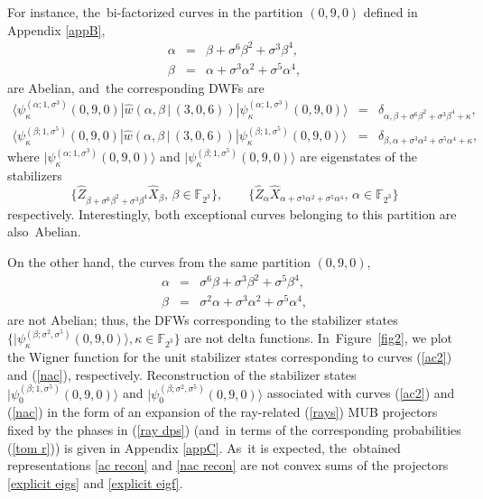 \documentclass[quantumrep,article,accept,pdftex,moreauthors]{Definitions/mdpi}
\begin{document}
For instance, the~bi-factorized curves in the partition $(0,9,0)$ defined in
Appendix \ref{appB},
\begin{eqnarray}
  \alpha
  &=& \beta + \sigma^{6} \beta^{2} + \sigma^{3}\beta^{4},
  \label{ac1} \\
  \beta
  &=& \alpha + \sigma^{3} \alpha^{2} + \sigma^{5}\alpha^{4},
  \label{ac2}
\end{eqnarray}
are Abelian, and~the corresponding DWFs are
\begin{eqnarray}
  \langle \psi_{\kappa}^{(\alpha ; 1,\sigma^{3})}(0,9,0)
  |\hat{w}\left(\alpha,\beta \, | \, (3,0,6)\right)
  |\psi_{\kappa}^{(\alpha ; 1,\sigma^{3})}(0,9,0)\rangle
  &=& \delta_{\alpha, \beta + \sigma^{6}\beta^{2} + \sigma^{3} \beta^{4} + \kappa}, \\
  \langle \psi_{\kappa }^{(\beta ; 1,\sigma^{5})}(0,9,0)
  |\hat{w}\left(\alpha,\beta \, | \, (3,0,6)\right)
  |\psi_{\kappa}^{(\beta ; 1,\sigma^{5})}(0,9,0)\rangle
  &=& \delta_{\beta,\alpha + \sigma^{3}\alpha^{2} + \sigma^{5} \alpha^{4} + \kappa},
  \label{ac2 delta}
\end{eqnarray}
where $|\psi_{\kappa}^{(\alpha ; 1,\sigma^{3})}(0,9,0)\rangle$ and
$|\psi_{\kappa }^{(\beta ; 1,\sigma^{5})}(0,9,0)\rangle$ are eigenstates of the
stabilizers
\begin{equation*}
  \{\hat{Z}_{\beta + \sigma^{6}\beta ^{2}+\sigma^{3}\beta^{4}} \hat{X}_{\beta},
  \, \beta \in \mathbb{F}_{2^{3}}\},
  \qquad \{\hat{Z}_{\alpha } \hat{X}_{\alpha + \sigma^{3}\alpha^{2} + \sigma^{5}\alpha^{4}},
  \, \alpha \in \mathbb{F}_{2^{3}}\}
\end{equation*}
respectively. Interestingly, both exceptional curves belonging to this partition
are also~Abelian.

On the other hand, the curves from the same partition $(0,9,0)$,
\begin{eqnarray}
  \alpha
  &=& \sigma^{6}\beta +\sigma^{3}\beta^{2}+\sigma^{5}\beta^{4},
  \label{nac1} \\
  \beta
  &=& \sigma^{2}\alpha +\sigma^{3}\alpha^{2}+\sigma^{5}\alpha^{4},
  \label{nac}
\end{eqnarray}
are not Abelian; thus, the DFWs corresponding to the stabilizer states
$\{|\psi_\kappa^{(\beta; \sigma^2, \sigma^{5})}(0,9,0)\rangle, \kappa \in
\mathbb F_{2^3}\}$ are not delta functions. In~Figure~\ref{fig2}, we plot the
Wigner function for the unit stabilizer states corresponding to  curves
(\ref{ac2}) and (\ref{nac}), respectively. Reconstruction of the stabilizer
states $|\psi_{0}^{(\beta ; 1,\sigma^{5})}(0,9,0)\rangle$ and $|\psi_{0}^{(\beta
;\sigma^{2},\sigma^{5})}(0,9,0)\rangle$ associated with  curves (\ref{ac2})
and (\ref{nac}) in the form of an expansion of the ray-related (\ref{rays}) MUB
projectors fixed by the phases in (\ref{ray dps}) (and~in terms of the
corresponding probabilities (\ref{tom r})) is given in Appendix \ref{appC}. As~it
is expected, the~obtained representations \eqref{ac recon} and \eqref{nac recon}
are not convex sums of the projectors \eqref{explicit eigs} and \eqref{explicit
eigf}.
\end{document}
